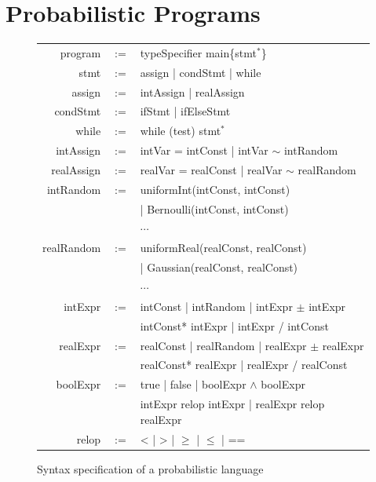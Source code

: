 \documentclass[sigconf,review, anonymous]{acmart}
\begin{document}
\section{Probabilistic Programs}
\begin{figure}[ht]
	\centering
	\begin{tabular}{rcl}
		\hline
		program & $:=$ & typeSpecifier main\{stmt$^*$\} \\
		stmt & $:=$ & assign | condStmt | while \\
		assign & $:=$ & intAssign | realAssign \\
		condStmt & $:=$ & ifStmt | ifElseStmt\\
		while & $:=$ & while (test) stmt$^*$\\
		intAssign & $:=$ &  intVar = intConst | intVar $\sim$ intRandom\\
		realAssign & $:=$ & realVar = realConst | realVar $\sim$ realRandom\\
		intRandom & $:=$ & uniformInt(intConst, intConst)\\
		&  & | Bernoulli(intConst, intConst)\\
		&  & $\cdots$ \\
		realRandom & $:=$ & uniformReal(realConst, realConst)\\
		&  & | Gaussian(realConst, realConst)\\
		&  & $\cdots$ \\
		intExpr & $:=$ & intConst | intRandom | intExpr $\pm$ intExpr\\
		& & intConst* intExpr | intExpr / intConst\\
		realExpr & $:=$ & realConst | realRandom | realExpr $\pm$ realExpr\\
		& & realConst* realExpr | realExpr / realConst\\
		boolExpr& $:=$ & true | false | boolExpr $\wedge$ boolExpr \\
		& & intExpr relop intExpr | realExpr relop realExpr\\
		relop & $:=$ & <  |  > | $\geq$ | $\leq$ | ==\\
		\hline
	\end{tabular}
	\caption{Syntax specification of a probabilistic language}	\label{syntax}
\end{figure}
\end{document}

